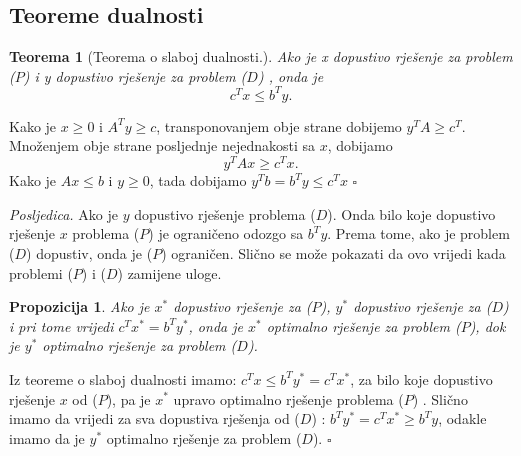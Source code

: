 \documentclass[a4paper, utf8, 11pt, colorlinks]{article}
\newtheorem{thm}{Teorema}
\newtheorem{prop}{Propozicija}
\newenvironment{proof}{{Dokaz:}}{\hfill$\square$}
\begin{document}
\subsection{Teoreme dualnosti}

\begin{thm}[Teorema o slaboj dualnosti.]
  Ako je x dopustivo rješenje za problem ($P$) i y dopustivo rješenje za problem  ($D$) , onda je 
  $$ c^T x \leq b^T y.$$
\end{thm}
\begin{proof}
         Kako je $x \geq 0$ i $A^T y \geq c $,  transponovanjem obje strane dobijemo 
         $y^T A \geq c^T$. Množenjem obje strane posljednje nejednakosti sa $x$, dobijamo 
         $$y^TAx \geq c^T x.$$ Kako je $Ax \leq b$ i $y \geq 0$,  tada dobijamo 
         $ y^T b = b^T y  \leq c^T x$
\end{proof}

\emph{Posljedica.} Ako je $y$ dopustivo rješenje problema  ($D$).  Onda bilo koje dopustivo rješenje $x$ problema ($P$) je ograničeno odozgo sa $b^T y$. Prema tome, ako je problem ($D$) dopustiv, onda je ($P$) ograničen. Slično se može pokazati da ovo vrijedi kada problemi ($P$) i ($D$) zamijene uloge.

\begin{prop}  
    Ako je $x^*$ dopustivo rješenje za  ($P$), $y^*$ dopustivo rješenje za ($D$) i pri tome vrijedi 
    $c^T x^* = b^T y^*$, onda je $x^*$ optimalno rješenje za problem  ($P$), dok je $y^*$ optimalno rješenje za problem  ($D$).  
\end{prop}
\begin{proof}
         Iz teoreme o slaboj dualnosti imamo: $c^T x  \leq b^T y^* = c^T x^*$, za bilo koje dopustivo rješenje $x$ od  ($P$), pa je $x^*$ upravo optimalno rješenje problema  ($P$) .
         Slično imamo da vrijedi za sva dopustiva rješenja od  ($D$) : $b^T y^* = c^T x^* \geq b^T y$, odakle imamo da je $y^*$ optimalno rješenje za problem  ($D$). 
\end{proof}
\end{document}
